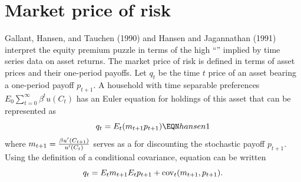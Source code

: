 
\section{Market price of risk}\label{sec:marketpriceofrisk}%
    Gallant, Hansen, and Tauchen (1990) and Hansen and
Jagannathan (1991) interpret the equity premium puzzle in terms
of the high ``'' implied by time series
data on asset returns.   The market price of risk
is defined in terms of asset prices and their one-period payoffs.
Let $q_t$ be the time $t$ price of an asset bearing
a one-period payoff $p_{t+1}$.    A household with time separable preferences
$ E_0 \sum_{t=0}^\infty \beta^t  u(C_t)$ has an  Euler equation for
holdings of this asset that can be represented as
$$ q_t = E_t (m_{t+1} p_{t+1}) \EQN hansen1 $$
where $m_{t+1} = {\beta u'(C_{t+1}) \over u'(C_t)}$ serves
as a  for discounting the
stochastic payoff $p_{t+1}$.
Using the definition of a conditional covariance,
equation  can be written
$$ q_t = E_t m_{t+1} E_t p_{t+1} + {\rm cov}_t (m_{t+1}, p_{t+1}) .$$

